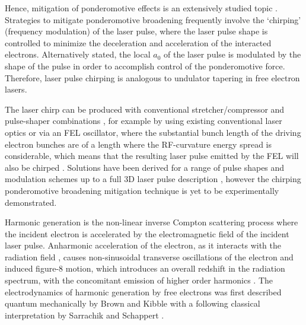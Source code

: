 \documentclass[../main.tex]{subfiles}
\begin{document}
Hence, mitigation of ponderomotive effects is an extensively studied topic \cite{ghebregziabher2013spectral,terzic2014narrow,seipt2015narrowband,rykovanov2016controlling,terzic2016combining,terzic2019improving}. Strategies to mitigate ponderomotive broadening frequently involve the `chirping' (frequency modulation) of the laser pulse, where the laser pulse shape is controlled to minimize the deceleration and acceleration of the interacted electrons. Alternatively stated, the local $a_{0}$ of the laser pulse is modulated by the shape of the pulse in order to accomplish control of the ponderomotive force. Therefore, laser pulse chirping is analogous to undulator tapering in free electron lasers.  

The laser chirp can be produced with conventional stretcher/compressor and pulse-shaper combinations \cite{ghebregziabher2013spectral}, for example by using existing conventional laser optics or via an FEL oscillator, where the substantial bunch length of the driving electron bunches are of a length where the RF-curvature energy spread is considerable, which means that the resulting laser pulse emitted by the FEL will also be chirped \cite{terzic2014narrow}. Solutions have been derived for a range of pulse shapes and modulation schemes up to a full 3D laser pulse description \cite{terzic2019improving}, however the chirping ponderomotive broadening mitigation technique is yet to be experimentally demonstrated.

Harmonic generation is the non-linear inverse Compton scattering process where the incident electron is accelerated by the electromagnetic field of the incident laser pulse. Anharmonic acceleration of the electron, as it interacts with the radiation field \cite{englert1983second}, causes non-sinusoidal transverse oscillations of the electron and induced figure-8 motion, which introduces an overall redshift in the radiation
spectrum, with the concomitant emission of higher order harmonics \cite{sakai2015observation}. The electrodynamics of harmonic generation by free electrons was first described quantum mechanically by Brown and Kibble \cite{brown1964interaction,kibble1965frequency} with a following classical interpretation by Sarrachik and Schappert \cite{sarachik1970classical}. 
\end{document}

